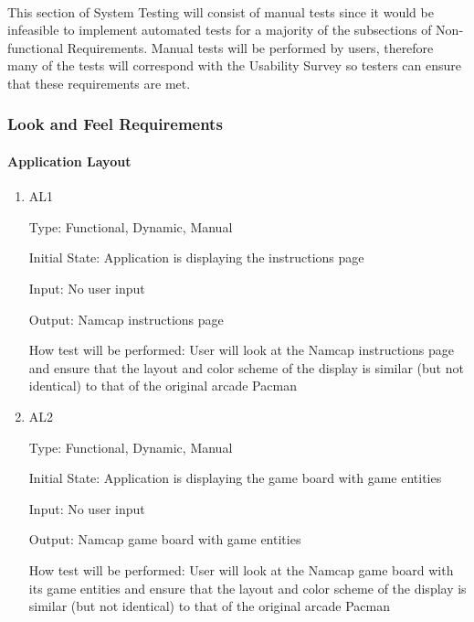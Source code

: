 \documentclass[12pt, titlepage]{article}
\begin{document}
\paragraph{}
This section of System Testing will consist of manual tests since it would be infeasible to implement automated tests for a majority of the subsections of Non-functional Requirements. Manual tests will be performed by users, therefore many of the tests will correspond with the Usability Survey so testers can ensure that these requirements are met.

\subsubsection{Look and Feel Requirements}
		
\paragraph{Application Layout}

\begin{enumerate}

\item{AL1\\}

Type: Functional, Dynamic, Manual
					
Initial State: Application is displaying the instructions page
					
Input: No user input
					
Output: Namcap instructions page
					
How test will be performed: User will look at the Namcap instructions page and ensure that the layout and color scheme of the display is similar (but not identical) to that of the original arcade Pacman
					
\item{AL2\\}

Type: Functional, Dynamic, Manual
					
Initial State: Application is displaying the game board with game entities
					
Input: No user input
					
Output: Namcap game board with game entities
					
How test will be performed: User will look at the Namcap game board with its game entities and ensure that the layout and color scheme of the display is similar (but not identical) to that of the original arcade Pacman

\end{enumerate}
\end{document}
